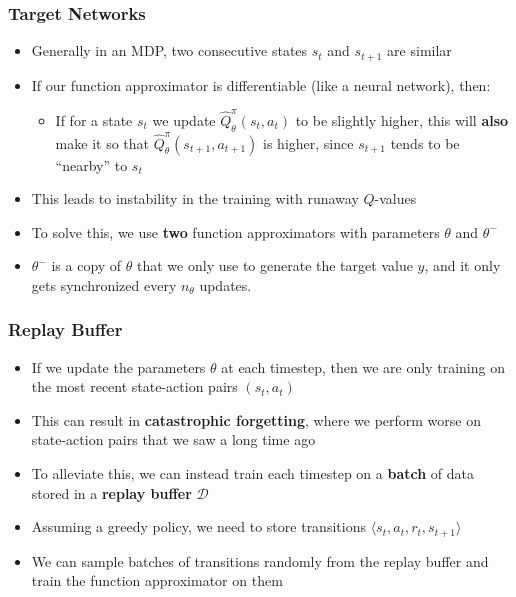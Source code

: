 \documentclass{beamer}
\begin{document}
\begin{frame}
  \frametitle{Target Networks}
  \begin{itemize}
    \item Generally in an MDP, two consecutive states $s_t$ and $s_{t+1}$ are similar
    \item If our function approximator is differentiable (like a neural network), then:
    \begin{itemize}
      \item If for a state $s_t$ we update $\widehat{Q}_{\theta}^\pi(s_t, a_t)$ to be slightly higher, this will \textbf{also} make it so that $\widehat{Q}_{\theta}^\pi(s_{t+1}, a_{t+1})$ is higher, since $s_{t+1}$ tends to be ``nearby'' to $s_t$
    \end{itemize}
    \item This leads to instability in the training with runaway $Q$-values
    \item To solve this, we use \textbf{two} function approximators with parameters $\theta$ and $\theta^-$
    \item $\theta^-$ is a copy of $\theta$ that we only use to generate the target value $y$, and it only gets synchronized every $n_\theta$ updates.
  \end{itemize}
\end{frame}

\begin{frame}
  \frametitle{Replay Buffer}
  \begin{itemize}
    \item If we update the parameters $\theta$ at each timestep, then we are only training on the most recent state-action pairs $(s_t, a_t)$
    \item This can result in \textbf{catastrophic forgetting}, where we perform worse on state-action pairs that we saw a long time ago
    \item To alleviate this, we can instead train each timestep on a \textbf{batch} of data stored in a \textbf{replay buffer} $\mathcal{D}$
    \item Assuming a greedy policy, we need to store transitions $\langle s_t, a_t, r_t, s_{t+1} \rangle$
    \item We can sample batches of transitions randomly from the replay buffer and train the function approximator on them
  \end{itemize}
\end{frame}
\end{document}
